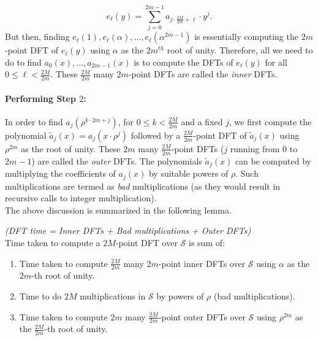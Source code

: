 \documentclass[11pt]{article}
\begin{document}
\begin{equation*}
e_\ell(y) = \sum_{j=0}^{2m-1}{a_{j \cdot \frac{2M}{2m} + \ell} \cdot y^j}.
\end{equation*}
But then, finding $e_\ell(1), e_\ell(\alpha), \ldots,
e_\ell(\alpha^{2m-1})$ is essentially computing the $2m$-point DFT of
$e_\ell(y)$ using $\alpha$ as the $2m^{th}$ root of unity. Therefore,
all we need to do to find $a_0(x), \ldots, a_{2m-1}(x)$ is to compute
the DFTs of $e_\ell(y)$ for all $0 \leq \ell < \frac{2M}{2m}$. These
$\frac{2M}{2m}$ many $2m$-point DFTs are called the \emph{inner} DFTs.

\paragraph{Performing Step $2$:} In order to find $a_j(\rho^{k \cdot
  2m + j})$, for $0 \leq k < \frac{2M}{2m}$ and a fixed $j$, we first
compute the polynomial $\tilde{a}_j(x) = a_j(x \cdot \rho^j)$ followed
by a $\frac{2M}{2m}$-point DFT of $\tilde{a}_j(x)$ using $\rho^{2m}$
as the root of unity. These $2m$ many $\frac{2M}{2m}$-point DFTs ($j$
running from $0$ to $2m - 1$) are called the \emph{outer} DFTs. The
polynomials $\tilde{a}_j(x)$ can be computed by multiplying the
coefficients of $a_j(x)$ by suitable powers of $\rho$. Such
multiplications are termed as \emph{bad} multiplications (as they would result in recursive calls to integer
multiplication). \\

\noindent The above discussion is summarized in the following lemma.

\begin{lemma} \label{lem:inoutDFT} \emph{\textsf{(DFT time = Inner
      DFTs + Bad multiplications + Outer DFTs)}} \\ Time taken to
  compute a $2M$-point DFT over $\mathcal{S}$ is sum of:
\begin{enumerate}
\item Time taken to compute $\frac{2M}{2m}$ many $2m$-point inner DFTs over $\mathcal{S}$ using $\alpha$ as the $2m$-th root of unity.
\item Time to do $2M$ multiplications in $\mathcal{S}$ by powers of
  $\rho$ (bad multiplications).
\item Time taken to compute $2m$ many $\frac{2M}{2m}$-point outer DFTs over $\mathcal{S}$ using $\rho^{2m}$ as the $\frac{2M}{2m}$-th root of unity.
\end{enumerate}
\end{lemma}
\end{document}
